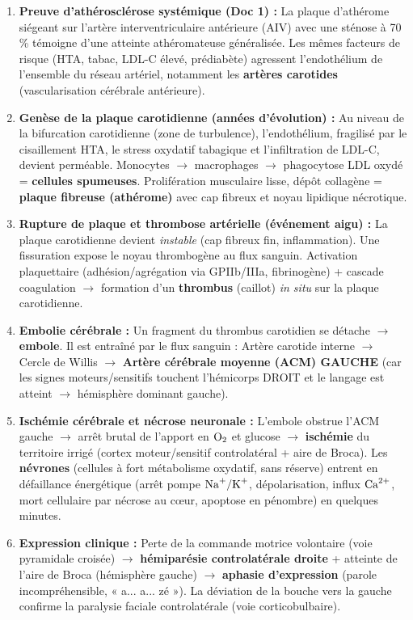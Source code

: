 \documentclass[11pt]{article}
\newcommand{\cle}[1]{{\popxbold\color{popdark}#1}}
\begin{document}
\begin{exoresolu}
\begin{enumerate}
  \item \textbf{Preuve d'athérosclérose systémique (Doc 1) :} La plaque d'\cle{athérome} siégeant sur l'artère interventriculaire antérieure (AIV) avec une \cle{sténose} à 70 \% témoigne d'une atteinte athéromateuse généralisée. Les mêmes facteurs de risque (HTA, tabac, LDL-C élevé, prédiabète) agressent l'endothélium de l'ensemble du réseau artériel, notamment les \textbf{artères carotides} (vascularisation cérébrale antérieure).
  \item \textbf{Genèse de la plaque carotidienne (années d'évolution) :} Au niveau de la bifurcation carotidienne (zone de turbulence), l'endothélium, fragilisé par le cisaillement HTA, le stress oxydatif tabagique et l'infiltration de LDL-C, devient perméable. Monocytes $\rightarrow$ macrophages $\rightarrow$ phagocytose LDL oxydé = \textbf{cellules spumeuses}. Prolifération musculaire lisse, dépôt collagène = \textbf{plaque fibreuse (athérome)} avec cap fibreux et noyau lipidique nécrotique.
  \item \textbf{Rupture de plaque et thrombose artérielle (événement aigu) :} La plaque carotidienne devient \emph{instable} (cap fibreux fin, inflammation). Une fissuration expose le noyau thrombogène au flux sanguin. Activation plaquettaire (adhésion/agrégation via GPIIb/IIIa, fibrinogène) + cascade coagulation $\rightarrow$ formation d'un \textbf{thrombus} (caillot) \emph{in situ} sur la plaque carotidienne.
  \item \textbf{Embolie cérébrale :} Un fragment du thrombus carotidien se détache $\rightarrow$ \textbf{embole}. Il est entraîné par le flux sanguin : Artère carotide interne $\rightarrow$ Cercle de Willis $\rightarrow$ \textbf{Artère cérébrale moyenne (ACM) GAUCHE} (car les signes moteurs/sensitifs touchent l'hémicorps DROIT et le langage est atteint $\rightarrow$ hémisphère dominant gauche).
  \item \textbf{Ischémie cérébrale et nécrose neuronale :} L'embole obstrue l'ACM gauche $\rightarrow$ arrêt brutal de l'apport en $\ce{O2}$ et glucose $\rightarrow$ \textbf{ischémie} du territoire irrigé (cortex moteur/sensitif controlatéral + aire de Broca). Les \textbf{névrones} (cellules à fort métabolisme oxydatif, sans réserve) entrent en défaillance énergétique (arrêt pompe $\ce{Na+/K+}$, dépolarisation, influx $\ce{Ca^{2+}}$, mort cellulaire par nécrose au cœur, apoptose en pénombre) en quelques minutes.
  \item \textbf{Expression clinique :} Perte de la commande motrice volontaire (voie pyramidale croisée) $\rightarrow$ \textbf{hémiparésie controlatérale droite} + atteinte de l'aire de Broca (hémisphère gauche) $\rightarrow$ \textbf{aphasie d'expression} (parole incompréhensible, « a... a... zé »). La déviation de la bouche vers la gauche confirme la paralysie faciale controlatérale (voie corticobulbaire).
\end{enumerate}


\end{exoresolu}
\end{document}
